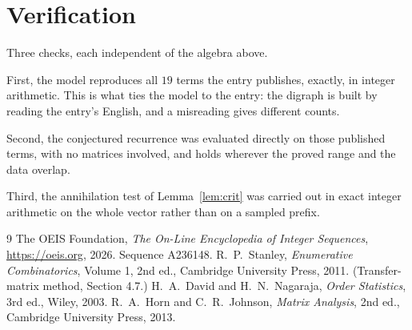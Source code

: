 \documentclass[11pt,a4paper]{article}
\theoremstyle{plain}
\theoremstyle{definition}
\begin{document}
\section{Verification}

Three checks, each independent of the algebra above.

First, the model reproduces all $19$ terms the entry publishes, exactly, in integer
arithmetic. This is what ties the model to the entry: the digraph is built by reading the
entry's English, and a misreading gives different counts.

Second, the conjectured recurrence was evaluated directly on those published terms, with no
matrices involved, and holds wherever the proved range and the data overlap.

Third, the annihilation test of Lemma~\ref{lem:crit} was carried out in exact integer
arithmetic on the whole vector rather than on a sampled prefix.

\begin{thebibliography}{9}
 The OEIS Foundation, \emph{The On-Line Encyclopedia of Integer
Sequences}, \url{https://oeis.org}, 2026. Sequence A236148.
 R.~P.~Stanley, \emph{Enumerative Combinatorics}, Volume 1, 2nd ed.,
Cambridge University Press, 2011. (Transfer-matrix method, Section 4.7.)
 H.~A.~David and H.~N.~Nagaraja, \emph{Order Statistics}, 3rd ed., Wiley,
2003.
 R.~A.~Horn and C.~R.~Johnson, \emph{Matrix Analysis}, 2nd ed., Cambridge
University Press, 2013.
\end{thebibliography}
\end{document}
